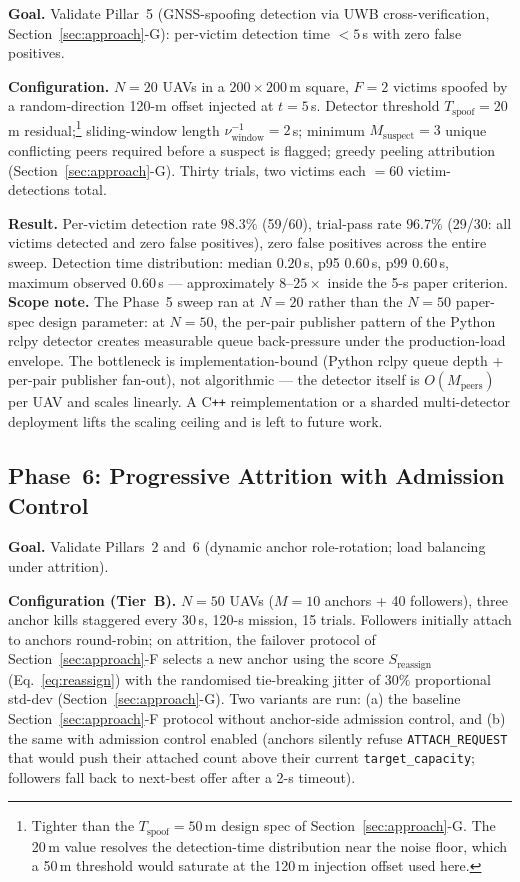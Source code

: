 \documentclass[journal,10pt,twocolumn]{IEEEtran}
\begin{document}
\textbf{Goal.} Validate Pillar~5 (GNSS-spoofing detection via UWB cross-verification, Section~\ref{sec:approach}-G): per-victim detection time $<5$\,s with zero false positives.

\textbf{Configuration.} $N{=}20$ UAVs in a $200\times 200$\,m square, $F{=}2$ victims spoofed by a random-direction 120-m offset injected at $t{=}5$\,s. Detector threshold $T_\text{spoof}{=}20$\,m residual;\footnote{Tighter than the $T_\text{spoof}=50$\,m design spec of Section~\ref{sec:approach}-G. The 20\,m value resolves the detection-time distribution near the noise floor, which a 50\,m threshold would saturate at the 120\,m injection offset used here.} sliding-window length $\nu_\text{window}^{-1}{=}2$\,s; minimum $M_\text{suspect}{=}3$ unique conflicting peers required before a suspect is flagged; greedy peeling attribution (Section~\ref{sec:approach}-G). Thirty trials, two victims each $=60$ victim-detections total.

\textbf{Result.} Per-victim detection rate $98.3\%$ (59/60), trial-pass rate $96.7\%$ (29/30: all victims detected and zero false positives), zero false positives across the entire sweep. Detection time distribution: median $0.20$\,s, p95 $0.60$\,s, p99 $0.60$\,s, maximum observed $0.60$\,s --- approximately $8$--$25\times$ inside the 5-s paper criterion. \textbf{Scope note.} The Phase~5 sweep ran at $N{=}20$ rather than the $N{=}50$ paper-spec design parameter: at $N{=}50$, the per-pair publisher pattern of the Python rclpy detector creates measurable queue back-pressure under the production-load envelope. The bottleneck is implementation-bound (Python rclpy queue depth + per-pair publisher fan-out), not algorithmic --- the detector itself is $O(M_\text{peers})$ per UAV and scales linearly. A C\texttt{++} reimplementation or a sharded multi-detector deployment lifts the scaling ceiling and is left to future work.

\subsection{Phase~6: Progressive Attrition with Admission Control}
\label{sec:phase6-attrition}

\textbf{Goal.} Validate Pillars~2 and~6 (dynamic anchor role-rotation; load balancing under attrition).

\textbf{Configuration (Tier~B).} $N{=}50$ UAVs ($M{=}10$ anchors + 40 followers), three anchor kills staggered every 30\,s, 120-s mission, 15 trials. Followers initially attach to anchors round-robin; on attrition, the failover protocol of Section~\ref{sec:approach}-F selects a new anchor using the score $S_\text{reassign}$ (Eq.~\ref{eq:reassign}) with the randomised tie-breaking jitter of $30\%$ proportional std-dev (Section~\ref{sec:approach}-G). Two variants are run: (a) the baseline Section~\ref{sec:approach}-F protocol without anchor-side admission control, and (b) the same with admission control enabled (anchors silently refuse \texttt{ATTACH\_REQUEST} that would push their attached count above their current \texttt{target\_capacity}; followers fall back to next-best offer after a 2-s timeout).
\end{document}
